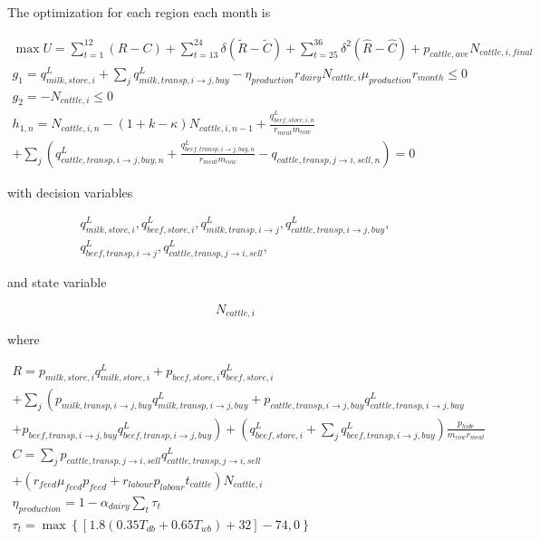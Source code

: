 \documentclass[letter,12pt]{article}
\begin{document}
The optimization for each region each month is

\begin{gather}
\max U = \sum_{t=1}^{12} \left(R - C\right) + \sum_{t=13}^{24} \delta \left(\tilde{R} - \tilde{C}\right) + \sum_{t=25}^{36} \delta^2 \left(\hat{R} - \hat{C}\right) + p_{cattle,ave} N_{cattle,i,final} \\
g_1 = q_{milk,store,i}^L + \sum_j q_{milk,transp,i \rightarrow j,buy}^L - \eta_{production} r_{dairy} N_{cattle,i} \mu_{production} r_{month} \leq 0\\
g_2 = - N_{cattle,i} \leq 0 \\
h_{1,n} = N_{cattle,i,n} - \left(1 + k - \kappa \right) N_{cattle,i,n-1} + \frac{q_{beef,store,i,n}^L}{r_{meat} m_{cow}} \nonumber \\
+ \sum_j \left( q_{cattle,transp,i \rightarrow j,buy,n}^L + \frac{q_{beef,transp,i \rightarrow j,buy,n}^L}{r_{meat} m_{cow}} - q_{cattle,transp,j\rightarrow i,sell,n} \right)= 0
\end{gather}

\noindent with decision variables

\begin{gather}
q_{milk,store,i}^L,q_{beef,store,i}^L,q_{milk,transp,i \rightarrow j}^L,q_{cattle,transp,i \rightarrow j,buy}^L, \nonumber \\
q_{beef,transp,i \rightarrow j}^L,q_{cattle,transp,j \rightarrow i,sell}^L, 
\end{gather}

\noindent and state variable

\begin{equation}
N_{cattle,i}
\end{equation}

\noindent where

\begin{gather}
R = p_{milk,store,i} q_{milk,store,i}^L + p_{beef,store,i} q_{beef,store,i}^L \nonumber \\
+ \sum_j \left( p_{milk,transp,i \rightarrow j,buy} q_{milk,transp,i \rightarrow j,buy}^L + p_{cattle,transp,i \rightarrow j,buy} q_{cattle,transp,i \rightarrow j,buy}^L \right. \\
\left. + p_{beef,transp,i \rightarrow j,buy} q_{beef,transp,i \rightarrow j,buy}^L \right) + \left(q_{beef,store,i}^L + \sum_j q_{beef,transp,i \rightarrow j,buy}^L \right) \frac{p_{hide}}{m_{cow} r_{meat}} \\
C = \sum_j p_{cattle,transp,j \rightarrow i,sell} q_{cattle,transp,j \rightarrow i,sell}^L \nonumber \\
+ \left(r_{feed} \mu_{feed} p_{feed} + r_{labour} p_{labour} t_{cattle} \right) N_{cattle,i} \\
\eta_{production} = 1- \alpha_{dairy} \sum_t \tau_t \\
\tau_t = \max \left\{\left[1.8 \left(0.35 T_{db} + 0.65 T_{wb}\right) + 32\right] - 74,0\right\}
\end{gather}
\end{document}
